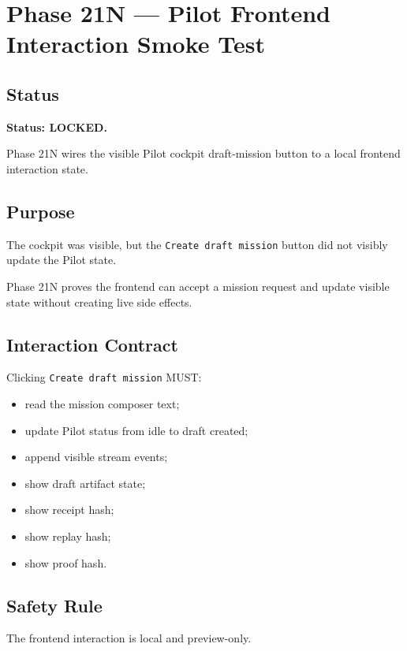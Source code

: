 \section{Phase 21N --- Pilot Frontend Interaction Smoke Test}
\label{sec:aion-phase21n-pilot-frontend-interaction-smoke}

\subsection{Status}

\textbf{Status: LOCKED.}

Phase 21N wires the visible Pilot cockpit draft-mission button to a local frontend interaction state.

\subsection{Purpose}

The cockpit was visible, but the \texttt{Create draft mission} button did not visibly update the Pilot state.

Phase 21N proves the frontend can accept a mission request and update visible state without creating live side effects.

\subsection{Interaction Contract}

Clicking \texttt{Create draft mission} MUST:

\begin{itemize}
  \item read the mission composer text;
  \item update Pilot status from idle to draft created;
  \item append visible stream events;
  \item show draft artifact state;
  \item show receipt hash;
  \item show replay hash;
  \item show proof hash.
\end{itemize}

\subsection{Safety Rule}

The frontend interaction is local and preview-only.


